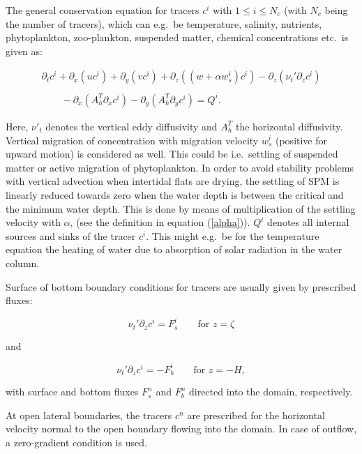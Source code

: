 The general conservation equation for tracers $c^i$ with $1\leq i \leq N_c$
(with $N_c$ being the number of tracers), 
which can e.g.\ be temperature,
salinity, nutrients, phytoplankton, zoo-plankton, suspended matter,
chemical concentrations etc.\ is given as:

\begin{equation}\label{densz}
\begin{array}{l}
\partial_t c^i +\partial_x (uc^i) +\partial_y(vc^i) 
+\partial_z ((w+\alpha w_s^i)c^i)
-\partial_z(\nu_t' \partial_z c^i)
\\ \\ \displaystyle \qquad
-\partial_x(A_h^T \partial_x c^i)
-\partial_y(A_h^T \partial_y c^i)
=Q^i.
\end{array} 
\end{equation}

Here, $\nu'_t$ denotes the vertical eddy diffusivity and
$A_h^T$ the horizontal diffusivity.
Vertical migration of concentration with migration velocity
$w_s^i$ (positive for upward motion) is considered as well. This could be 
i.e.\ settling of suspended matter or active migration of
phytoplankton.  
In order to avoid stability problems with vertical advection when 
intertidal flats are drying, the settling of SPM is linearly 
reduced towards zero when the water
depth is between the critical and the minimum water depth. 
This is
done by means of multiplication of the settling velocity with $\alpha$,
(see the definition in equation (\ref{alpha})).
$Q^i$ denotes all internal sources and sinks of the tracer $c^i$.
This might e.g.\ be for the temperature equation the heating of water
due to absorption of solar radiation in the water column.

Surface of bottom boundary conditions for tracers are usually given
by prescribed fluxes:

\begin{equation}\label{SurfFlux}
\nu_t' \partial_z c^i = F^i_s  \qquad \mbox{for } z=\zeta
\end{equation}

and 

\begin{equation}\label{BottFlux}
\nu_t' \partial_z c^i = -F^i_b  \qquad \mbox{for } z=-H,
\end{equation}

with surface and bottom fluxes $F^n_s$ and $F^n_b$ directed
into the domain, respectively. 

At open lateral boundaries, the tracers $c^n$ are prescribed for
the horizontal velocity normal to the open boundary 
flowing into the domain. In case of outflow, a zero-gradient condition is
used. 

